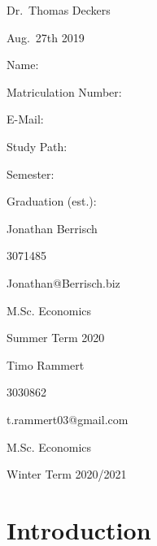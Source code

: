 \documentclass[11pt,]{article}
\begin{document}
\begin{titlepage}
  \noindent\begin{minipage}[t]{0.3\textwidth}
  \end{minipage}
  \begin{minipage}[t]{0.7\textwidth}
  \hspace{1cm}Dr.~Thomas Deckers
  \end{minipage}

  \noindent\begin{minipage}[t]{0.3\textwidth}
  \end{minipage}
  \begin{minipage}[t]{0.7\textwidth}
  \hspace{1cm}Aug.~27th 2019
  \end{minipage}

  \hrulefill

  \begin{multicols}{3}

  Name:

  Matriculation Number:

  E-Mail:

  Study Path:

  Semester:

  Graduation (est.):

  \columnbreak

  Jonathan Berrisch

  3071485

  Jonathan@Berrisch.biz

  M.Sc. Economics


  Summer Term 2020

  \columnbreak

  Timo Rammert

  3030862

  t.rammert03@gmail.com

  M.Sc. Economics


  Winter Term 2020/2021

  \end{multicols}

\end{titlepage}


{
\hypersetup{linkcolor=black}
\setcounter{tocdepth}{3}
\tableofcontents
}
\newpage
\listoftables
{}
\newpage
\listoffigures
{}
\newpage
{}
\hypertarget{introduction}{%
\section{Introduction}\label{introduction}}
\end{document}
